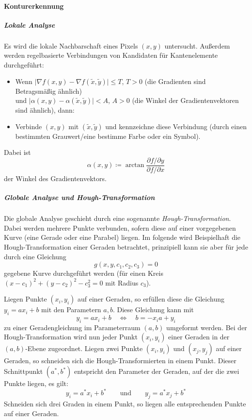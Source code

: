 				\paragraph{Konturerkennung}
					\subparagraph{Lokale Analyse}
						Es wird die lokale Nachbarschaft eines Pixels \( (x, y) \) untersucht. Außerdem werden regelbasierte Verbindungen von Kandidaten für Kantenelemente durchgeführt:
						\begin{itemize}
							\item Wenn \( \big\lvert \nabla f(x, y) - \nabla f(\tilde{x}, \tilde{y}) \big\rvert \leq T \), \( T > 0 \) (die Gradienten sind Betragsmäßig ähnlich) \\ und \( \big\lvert \alpha(x, y) - \alpha(\tilde{x}, \tilde{y}) \big\rvert < A \), \( A > 0 \) (die Winkel der Gradientenvektoren sind ähnlich), dann:
							\item Verbinde \( (x, y) \) mit \( (\tilde{x}, \tilde{y}) \) und kennzeichne diese Verbindung (\zB durch einen bestimmten Grauwert/eine bestimme Farbe oder ein Symbol).
						\end{itemize}
						Dabei ist
						\begin{equation*}
							\alpha(x, y) \coloneqq \arctan \frac{\partial f / \partial y}{\partial f / \partial x}
						\end{equation*}
						der Winkel des Gradientenvektors.

					\subparagraph{Globale Analyse und Hough-Transformation}
						Die globale Analyse geschieht durch eine sogenannte \emph{Hough-Transformation}. Dabei werden mehrere Punkte verbunden, sofern diese auf einer vorgegebenen Kurve (\zB eine Gerade oder eine Parabel) liegen. Im folgende wird Beispielhaft die Hough-Transformation \bzgl einer Geraden betrachtet, prinzipiell kann sie aber für jede durch eine Gleichung
						\begin{equation*}
							g(x, y, c_1, c_2, c_3) = 0
						\end{equation*}
						gegebene Kurve durchgeführt werden (\zB für einen Kreis \( (x - c_1)^2 + (y - c_2)^2 - c_3^2 = 0 \) mit Radius \( c_3 \)).
						
						Liegen Punkte \( (x_i, y_i) \) auf einer Geraden, so erfüllen diese die Gleichung \( y_i = ax_i + b \) mit den Parametern \(a, b\). Diese Gleichung kann mit
						\begin{equation*}
							y_i = ax_i + b \quad\iff\quad b = -x_ia + y_i
						\end{equation*}
						zu einer Geradengleichung im Parameterraum \( (a, b) \) umgeformt werden. Bei der Hough-Transformation wird nun jeder Punkt \( (x_i, y_i) \) einer Geraden in der \( (a, b) \)-Ebene zugeordnet. Liegen zwei Punkte \( (x_i, y_i) \) und \( (x_j, y_j) \) auf einer Geraden, so schneiden sich die Hough-Transformierten in einem Punkt. Dieser Schnittpunkt \( (a^\ast, b^\ast) \) entspricht den Parameter der Geraden, auf der die zwei Punkte liegen, \dh es gilt:
						\begin{equation*}
							y_i = a^\ast x_i + b^\ast \quad\quad\text{und}\quad\quad y_j = a^\ast x_j + b^\ast
						\end{equation*}
						Schneiden sich drei Graden in einem Punkt, so liegen alle entsprechenden Punkte auf einer Geraden.
						
